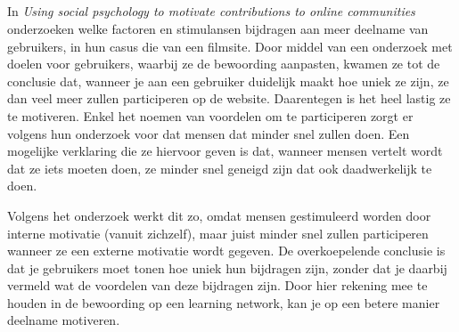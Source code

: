 \documentclass[a4paper, 10pt, pdftex]{report}
\begin{document}
      \subsection{\cite{Beenen2004}}

      In \emph{Using social psychology to motivate contributions to online communities} onderzoeken \citeauthor{Beenen2004} welke factoren en stimulansen bijdragen aan meer deelname van gebruikers, in hun casus die van een filmsite. Door middel van een onderzoek met doelen voor gebruikers, waarbij ze de bewoording aanpasten, kwamen ze tot de conclusie dat, wanneer je aan een gebruiker duidelijk maakt hoe uniek ze zijn, ze dan veel meer zullen participeren op de website. Daarentegen is het heel lastig ze te motiveren. Enkel het noemen van voordelen om te participeren zorgt er volgens hun onderzoek voor dat mensen dat minder snel zullen doen. Een mogelijke verklaring die ze hiervoor geven is dat, wanneer mensen vertelt wordt dat ze iets moeten doen, ze minder snel geneigd zijn dat ook daadwerkelijk te doen.

      Volgens het onderzoek werkt dit zo, omdat mensen gestimuleerd worden door interne motivatie (vanuit zichzelf), maar juist minder snel zullen participeren wanneer ze een externe motivatie wordt gegeven. De overkoepelende conclusie is dat je gebruikers moet tonen hoe uniek hun bijdragen zijn, zonder dat je daarbij vermeld wat de voordelen van deze bijdragen zijn. Door hier rekening mee te houden in de bewoording op een learning network, kan je op een betere manier deelname motiveren.

     \subsection{\cite{Sohn2005}}
\end{document}
